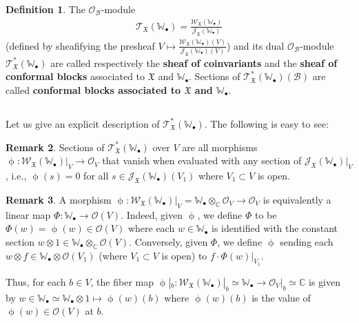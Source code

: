 \documentclass[11pt,b5paper,notitlepage]{article}
\theoremstyle{definition}
\newtheorem{df}{Definition}[section]
\newtheorem{rem}[df]{Remark}
\theoremstyle{plain}
\newcommand{\fk}{\mathfrak}
\newcommand{\mc}{\mathcal}
\newcommand{\scr}{\mathscr}
\newcommand{\blt}{\bullet}
\newcommand{\Wbb}{\mathbb W}
\newcommand{\Cbb}{\mathbb C}
\numberwithin{equation}{section}
\begin{document}
\begin{df}
The $\scr O_{\mc B}$-module \index{T@$\scr T_{\fk X}(\Wbb_\blt),\scr T_{\fk X}^*(\Wbb_\blt)$}
\begin{align}
\scr T_{\fk X}(\Wbb_\blt)=\frac{\scr W_{\fk X}(\Wbb_\blt)}{\scr J_{\fk X}(\Wbb_\blt)}
\end{align}
(defined by sheafifying the presheaf $V\mapsto \frac{\scr W_{\fk X}(\Wbb_\blt)(V)}{\scr J_{\fk X}(\Wbb_\blt)(V)}$) and its dual $\scr O_{\mc B}$-module $\scr T_{\fk X}^*(\Wbb_\blt)$ are called respectively the \textbf{sheaf of coinvariants} and the \textbf{sheaf of conformal blocks} associated to $\fk X$ and $\Wbb_\blt$. Sections of $\scr T_{\fk X}^*(\Wbb_\blt)(\mc B)$ are called \textbf{conformal blocks associated to $\fk X$ and $\Wbb_\blt$}.
\end{df} 



\subsection{}

Let us give an explicit description of $\scr T_{\fk X}^*(\Wbb_\blt)$. The following is easy to see:
\begin{rem}
Sections of $\scr T_{\fk X}^*(\Wbb_\blt)$ over $V$ are all morphisms $\upphi:\scr W_{\fk X}(\Wbb_\blt)|_V\rightarrow\scr O_V$ that vanish when evaluated with any section of $\scr J_{\fk X}(\Wbb_\blt)|_V$, i.e., $\upphi(s)=0$ for all $s\in\scr J_{\fk X}(\Wbb_\blt)(V_1)$ where $V_1\subset V$ is open.
\end{rem}



\begin{rem}
A morphism $\upphi:\scr W_{\fk X}(\Wbb_\blt)|_V=\Wbb_\blt\otimes_\Cbb\scr O_V\rightarrow\scr O_V$ is equivalently a linear map $\Phi:\Wbb_\blt\rightarrow\scr O(V)$. Indeed, given $\upphi$, we define $\Phi$ to be $\Phi(w)=\upphi(w)\in\scr O(V)$ where each $w\in\Wbb_\blt$ is identified with the constant section $w\otimes 1\in\Wbb_\blt\otimes_\Cbb\scr O(V)$. Conversely, given $\Phi$, we define $\upphi$ sending each $w\otimes f\in\Wbb_\blt\otimes\scr O(V_1)$ (where $V_1\subset V$ is open) to $f\cdot \Phi(w)|_{V_1}$.

Thus, for each $b\in V$, the fiber map $\upphi|_b:\scr W_{\fk X}(\Wbb_\blt)|_b\simeq\Wbb_\blt\rightarrow \scr O_V|_b\simeq\Cbb$ is given by $w\in\Wbb_\blt\simeq\Wbb_\blt\otimes 1\mapsto \upphi(w)(b)$ where $\upphi(w)(b)$ is the value of $\upphi(w)\in\scr O(V)$ at $b$.  \hfill\qedsymbol
\end{rem}
\end{document}
